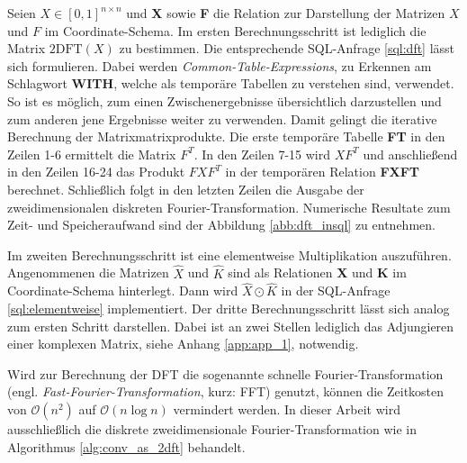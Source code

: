 Seien $X \in [0,1]^{n \times n}$ und \textbf{X} sowie \textbf{F} die Relation zur Darstellung der Matrizen $X$ und $F$ im Coordinate-Schema. Im ersten Berechnungsschritt ist lediglich die Matrix $\mathrm{2DFT}(X)$ zu bestimmen. Die entsprechende SQL-Anfrage \ref{sql:dft} lässt sich formulieren. Dabei werden \textit{Common-Table-Expressions}, zu Erkennen am Schlagwort \textbf{WITH}, welche als temporäre Tabellen zu verstehen sind, verwendet. So ist es möglich, zum einen Zwischenergebnisse übersichtlich darzustellen und zum anderen jene Ergebnisse weiter zu verwenden. Damit gelingt die iterative Berechnung der Matrixmatrixprodukte. Die erste temporäre Tabelle \textbf{FT}
in den Zeilen 1-6 ermittelt die Matrix $F^T$. In den Zeilen 7-15 wird $X F^T$ und anschließend in den Zeilen 16-24 das Produkt $F X F^T$ in der temporären Relation \textbf{FXFT} berechnet. 
Schließlich folgt in den letzten Zeilen die Ausgabe der zweidimensionalen diskreten Fourier-Transformation. Numerische Resultate zum Zeit- und Speicheraufwand sind der Abbildung \ref{abb:dft_insql} zu entnehmen.

    

Im zweiten Berechnungsschritt ist eine elementweise Multiplikation auszuführen. Angenommenen die Matrizen $\hat{X}$ und $\hat{K}$ sind als Relationen \textbf{X}
und \textbf{K} im Coordinate-Schema hinterlegt. Dann wird $\hat{X} \odot \hat{K}$ in der SQL-Anfrage \ref{sql:elementweise} implementiert.
Der dritte Berechnungsschritt lässt sich analog zum ersten Schritt darstellen. Dabei ist an zwei Stellen lediglich das Adjungieren einer komplexen Matrix, siehe Anhang \ref{app:app_1}, notwendig.



Wird zur Berechnung der DFT die sogenannte schnelle Fourier-Transformation (engl. \textit{Fast-Fourier-Transformation}, kurz: FFT) genutzt, können die Zeitkosten von $\mathcal{O}(n^2)$ auf $\mathcal{O}(n \log n)$ vermindert werden. In dieser Arbeit wird ausschließlich die diskrete zweidimensionale Fourier-Transformation wie in Algorithmus \ref{alg:conv_as_2dft} behandelt. 

